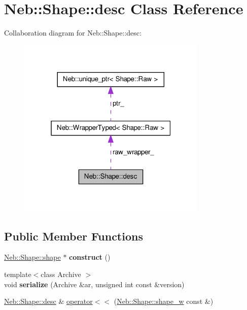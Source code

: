\hypertarget{classNeb_1_1Shape_1_1desc}{\section{\-Neb\-:\-:\-Shape\-:\-:desc \-Class \-Reference}
\label{classNeb_1_1Shape_1_1desc}
}


\-Collaboration diagram for \-Neb\-:\-:\-Shape\-:\-:desc\-:\nopagebreak
\begin{figure}[H]
\begin{center}
\leavevmode
\includegraphics[width=256pt]{classNeb_1_1Shape_1_1desc__coll__graph}
\end{center}
\end{figure}
\subsection*{\-Public \-Member \-Functions}
\begin{DoxyCompactItemize}
\item 
\hypertarget{classNeb_1_1Shape_1_1desc_aec54e9d9db3edfb8c2b9a137448de64b}{\hyperlink{classNeb_1_1Shape_1_1shape}{\-Neb\-::\-Shape\-::shape} $\ast$ {\bfseries construct} ()}\label{classNeb_1_1Shape_1_1desc_aec54e9d9db3edfb8c2b9a137448de64b}

\item 
\hypertarget{classNeb_1_1Shape_1_1desc_a88bfba50969272baa492ffe519f39b8d}{{\footnotesize template$<$class Archive $>$ }\\void {\bfseries serialize} (\-Archive \&ar, unsigned int const \&version)}\label{classNeb_1_1Shape_1_1desc_a88bfba50969272baa492ffe519f39b8d}

\item 
\hyperlink{classNeb_1_1Shape_1_1desc}{\-Neb\-::\-Shape\-::desc} \& \hyperlink{classNeb_1_1Shape_1_1desc_a8356295ceee1f17dd24afbdb455dd206}{operator$<$$<$} (\hyperlink{classNeb_1_1weak__ptr}{\-Neb\-::\-Shape\-::shape\-\_\-w} const \&)
\end{DoxyCompactItemize}
